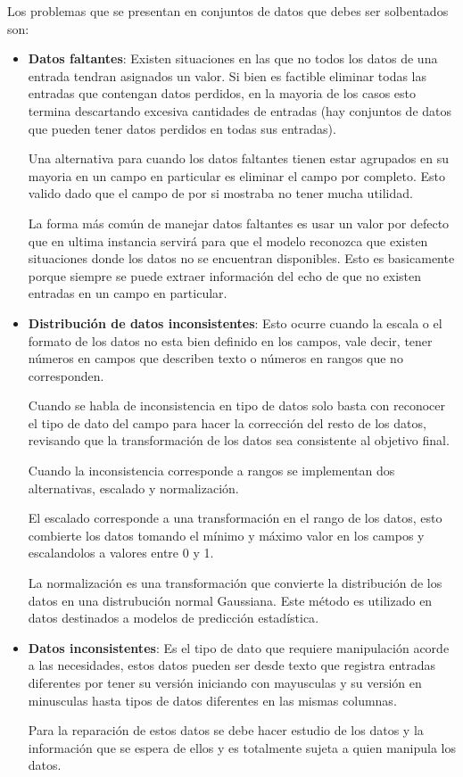\documentclass[letter,12pt]{report}
\begin{document}
Los problemas que se presentan en conjuntos de datos que debes ser solbentados son:
\begin{itemize}
    \item \textbf{Datos faltantes}: Existen situaciones en las que no todos los datos de una
        entrada tendran asignados un valor. Si bien es factible eliminar todas las
        entradas que contengan datos perdidos, en la mayoria de los casos esto termina
        descartando excesiva cantidades de entradas (hay conjuntos de datos que pueden
        tener datos perdidos en todas sus entradas).

        Una alternativa para cuando los datos faltantes tienen estar agrupados en su
        mayoria en un campo en particular es eliminar el campo por completo. Esto valido
        dado que el campo de por si mostraba no tener mucha utilidad.

        La forma más común de manejar datos faltantes es usar un valor por defecto que en
        ultima instancia servirá para que el modelo reconozca que existen situaciones
        donde los datos no se encuentran disponibles. Esto es basicamente porque siempre
        se puede extraer información del echo de que no existen entradas en un campo en
        particular\cite{Miss}.
    \item \textbf{Distribución de datos inconsistentes}: Esto ocurre cuando la escala o
        el formato de los datos no esta bien definido en los campos, vale decir, tener
        números en campos que describen texto o números en rangos que no corresponden.

        Cuando se habla de inconsistencia en tipo de datos solo basta con reconocer el
        tipo de dato del campo para hacer la corrección del resto de los datos, revisando
        que la transformación de los datos sea consistente al objetivo final.

        Cuando la inconsistencia corresponde a rangos se implementan dos alternativas,
        escalado y normalización.

        El escalado corresponde a una transformación en el rango de los datos, esto
        combierte los datos tomando el mínimo y máximo valor en los campos y escalandolos
        a valores entre 0 y 1.

        La normalización es una transformación que convierte la distribución de los datos
        en una distrubución normal Gaussiana. Este método es utilizado en datos
        destinados a modelos de predicción estadística\cite{Scal}.
    \item \textbf{Datos inconsistentes}: Es el tipo de dato que requiere manipulación
        acorde a las necesidades, estos datos pueden ser desde texto que registra
        entradas diferentes por tener su versión iniciando con mayusculas y su versión en
        minusculas hasta tipos de datos diferentes en las mismas columnas.

        Para la reparación de estos datos se debe hacer estudio de los datos y la
        información que se espera de ellos y es totalmente sujeta a quien manipula los
        datos\cite{Ingsoc}.
\end{itemize}
\end{document}
